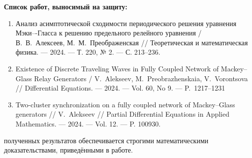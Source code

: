 \textbf{Список работ, выносимый на защиту:}
\begin{enumerate}[beginpenalty=10000] %
	\item Анализ асимптотической сходимости периодического решения уравнения Мэки–-Гласса к решению предельного релейного уравнения / В.~В.~Алексеев, М.~М.~Преображенская // Теоретическая и математическая физика. --- 2024. --- Т. 220, № 2. --- С. 213--236. \cite{wosbib1}
	\item Existence of Discrete Traveling Waves in Fully Coupled Network of Mackey--Glass Relay Generators / V.~Alekseev, M.~Preobrazhenskaia, V.~Vorontsova // Differential Equations. --- 2024. --- Vol. 60, No 9. --- P.~1217--1231 \cite{wosbib2}
	\item Two-cluster synchronization on a fully coupled network of Mackey--Glass generators // V.~Alekseev // Partial Differential Equations in Applied Mathematics. --- 2024. --- Vol. 12. --- P. 100930. \cite{scbib1}
\end{enumerate}



\bigskip

{\reliability} полученных результатов обеспечивается строгими математическими доказательствами, приведёнными в работе. %

\nocite{scbib1, wosbib1, wosbib2}

\bigskip

